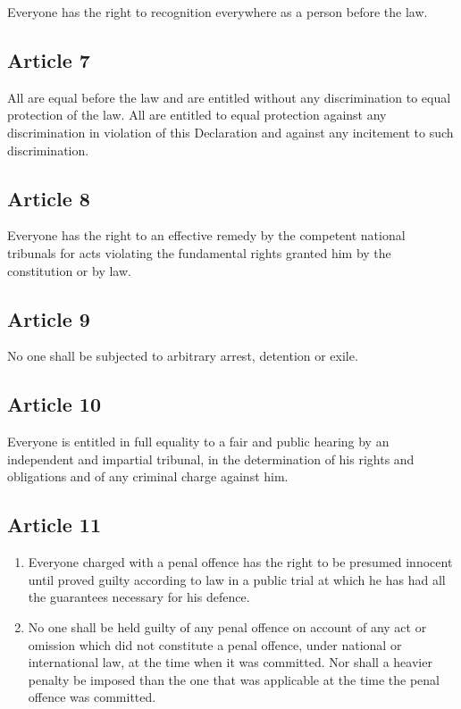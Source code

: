 \documentclass[
  titlepage,
  openright,
  DIV=calc,
  toc=listof,
  listof=nochaptergap]{scrbook}
\begin{document}
Everyone has the right to recognition everywhere as a person before the
law.

\subsection{Article 7}\label{article-7-4}

All are equal before the law and are entitled without any discrimination
to equal protection of the law. All are entitled to equal protection
against any discrimination in violation of this Declaration and against
any incitement to such discrimination.

\subsection{Article 8}\label{article-8-4}

Everyone has the right to an effective remedy by the competent national
tribunals for acts violating the fundamental rights granted him by the
constitution or by law.

\subsection{Article 9}\label{article-9-4}

No one shall be subjected to arbitrary arrest, detention or exile.

\subsection{Article 10}\label{article-10-4}

Everyone is entitled in full equality to a fair and public hearing by an
independent and impartial tribunal, in the determination of his rights
and obligations and of any criminal charge against him.

\subsection{Article 11}\label{article-11-4}

\begin{enumerate}
\def\labelenumi{\arabic{enumi}.}
\item
  Everyone charged with a penal offence has the right to be presumed
  innocent until proved guilty according to law in a public trial at
  which he has had all the guarantees necessary for his defence.
\item
  No one shall be held guilty of any penal offence on account of any act
  or omission which did not constitute a penal offence, under national
  or international law, at the time when it was committed. Nor shall a
  heavier penalty be imposed than the one that was applicable at the
  time the penal offence was committed.
\end{enumerate}
\end{document}
